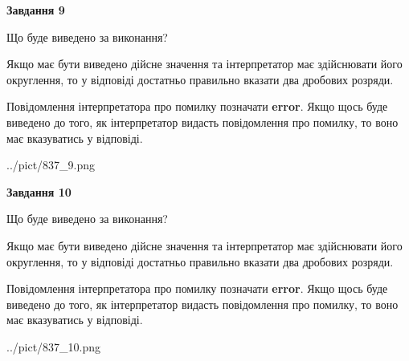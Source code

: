 \documentclass[12pt, ukrainian]{article}
\begin{document}
{\begin {Large}
{\begin {center}\textbf{Завдання 9}\end {center}}\par
Що буде виведено за виконання? \par

Якщо має бути виведено дійсне значення та інтерпретатор має здійснювати його округлення, 
то у відповіді достатньо правильно вказати два дробових розряди.

Повідомлення інтерпретатора про помилку позначати \textbf{error}.
Якщо щось буде виведено до того, як інтерпретатор видасть повідомлення про помилку, 
то воно має вказуватись у відповіді. \par

\begin{center}
	{../pict/837_9.png}
\end{center}
\newpage

{\begin {center}\textbf{Завдання 10}\end {center}}\par
Що буде виведено за виконання? \par

Якщо має бути виведено дійсне значення та інтерпретатор має здійснювати його округлення, 
то у відповіді достатньо правильно вказати два дробових розряди.

Повідомлення інтерпретатора про помилку позначати \textbf{error}.
Якщо щось буде виведено до того, як інтерпретатор видасть повідомлення про помилку, 
то воно має вказуватись у відповіді. \par

\begin{center}
	{../pict/837_10.png}
\end{center}
\newpage

\end {Large}}
\end{document}

